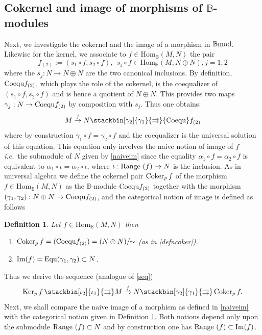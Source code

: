 \documentclass[12pt]{article}
\newtheorem{defn}[thm]{Definition}
\def\Hom{{\rm Hom}}
\def\Kpr{{\rm Ker}_p\,}
\def\Cpr{{\rm Coker}_p\,}
\def\equ{{\rm Equ}}
\def\coequ{{\rm Coequ}}
\def\B{{\mathbb B}}
\def\im{{\rm Im}}
\newcommand{\ie}{{\it i.e.\/}\ }
\def\Hom {{\mbox{Hom}}}
\def\bmod{{\rm \B mod}}
\begin{document}
\subsection{Cokernel  and image of morphisms of $\B$-modules}
Next, we investigate the cokernel and the image of a morphism in $\bmod$. Likewise for the kernel, we associate to $f\in \Hom_\B(M,N)$ the pair 
$$
f_{(2)}:=(s_1\circ f,s_2\circ f), \  \  s_j\circ f\in \Hom_\B(M,N\oplus N), j=1,2
$$
where the $s_j:N\to N\oplus N$ are the two canonical inclusions. By definition, $\coequ f_{(2)}$, which plays the role of the cokernel, is the coequalizer of $(s_1\circ f,s_2\circ f)$ and is hence a quotient of $N\oplus N$. This provides two maps $\gamma_j:N\to\coequ f_{(2)}$ by composition with $s_j$. Thus one obtains: 
\begin{equation}\label{defncoker}
	M\stackrel{f}{\to} N \stackbin[\gamma_2]{\gamma_1}{\rightrightarrows}\coequ f_{(2)}
\end{equation}
where by construction $ \gamma_1\circ f=\gamma_2\circ f$ and the coequalizer is the universal solution of this equation. This equation only involves the naive notion of image of $f$ \ie the submodule of $N$ given by \eqref{naiveim}
since the equality $ \alpha_1\circ f=\alpha_2\circ f$ is equivalent to $ \alpha_1\circ \iota=\alpha_2\circ \iota$, where $\iota:{\rm Range}\ (f)\to N$ is the inclusion. \newline
As in universal algebra we define the cokernel pair $\Cpr f$ of the morphism $f\in \Hom_\B(M,N)$ as the $\B$-module $\coequ f_{(2)}$ together with the morphism $(\gamma_1,\gamma_2):N\oplus N \to \coequ f_{(2)}$, and the categorical notion of image is defined as follows
\begin{defn}\label{propimagedefn} Let $f\in \Hom_\B(M,N)$ then 
\begin{enumerate}
\item $\Cpr f = (\coequ f_{(2)})=(N\oplus N)/\!\!\sim$ (as in \eqref{defncoker}).
\item $\im (f)=\equ(\gamma_1,\gamma_2)\subset N$.
\end{enumerate}	
\end{defn}
 
Thus we derive  the sequence  (analogue of \eqref{seq})
\[
\Kpr f\, \stackbin[\iota_2]{\iota_1}{\rightrightarrows} M\stackrel{f}{\to} N \stackbin[\gamma_2]{\gamma_1}{\rightrightarrows}\,\Cpr f.
\] 
Next, we shall compare the naive image of a morphism as defined in \eqref{naiveim} with the categorical notion given in Definition \ref{propimagedefn}. Both notions depend only upon the submodule ${\rm Range}\ (f)\subset N$ and by construction one has ${\rm Range}\ (f)\subset\im (f)$. 
\end{document}

